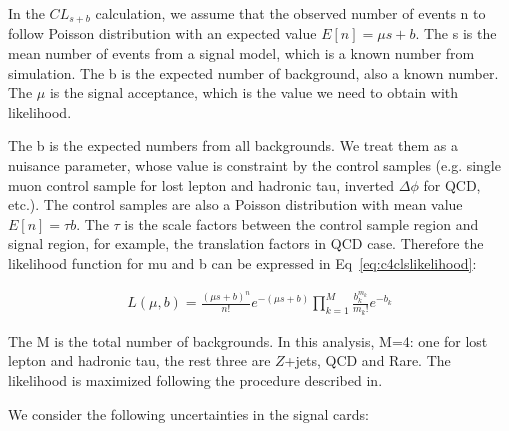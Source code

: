 In the $CL_{s+b}$ calculation, we assume that the observed number of events n to follow Poisson distribution with an expected value $E[n]=\mu s+b$. The s is the mean number of events from a signal model, which is a known number from simulation. The b is the expected number of background, also a known number. The $\mu$ is the signal acceptance, which is the value we need to obtain with likelihood. 

The b is the expected numbers from all backgrounds. We treat them as a nuisance parameter, whose value is constraint by the control samples (e.g. single muon control sample for lost lepton and hadronic tau, inverted $\Delta \phi$ for QCD, etc.). The control samples are also a Poisson distribution with mean value $E[n]=\tau b$. The $\tau$ is the scale factors between the control sample region and signal region, for example, the translation factors in QCD case. Therefore the likelihood function for mu and b can be expressed in Eq~\ref{eq:c4clslikelihood}:

\begin{equation}
 \begin{aligned}
  L(\mu,b)= \frac{(\mu s+b)^{n}}{n!}e^{-(\mu s+b)} \prod_{k=1}^{M}\frac{b_{k}^{m_{k}}}{m_{k}!}e^{-b_{k}}
 \end{aligned}
 \label{eq:c4clslikelihood}
\end{equation}

The M is the total number of backgrounds. In this analysis, M=4: one for lost lepton and hadronic tau, the rest three are $Z$+jets, QCD and Rare. The likelihood is maximized following the procedure described in\cite{Cowan:2010js}.

We consider the following uncertainties in the signal cards: 

